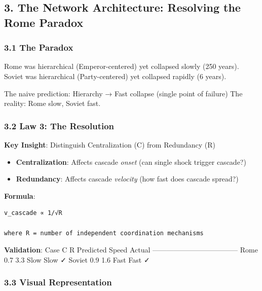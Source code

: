 \documentclass[11pt,letterpaper]{article}
\providecommand{\tightlist}{%
  \setlength{\itemsep}{0pt}\setlength{\parskip}{0pt}}
\begin{document}
\subsection{3. The Network Architecture: Resolving the Rome
Paradox}\label{the-network-architecture-resolving-the-rome-paradox}

\subsubsection{3.1 The Paradox}\label{the-paradox}

Rome was hierarchical (Emperor-centered) yet collapsed slowly (250
years). Soviet was hierarchical (Party-centered) yet collapsed rapidly
(6 years).

The naive prediction: Hierarchy → Fast collapse (single point of
failure) The reality: Rome slow, Soviet fast.

\subsubsection{3.2 Law 3: The Resolution}\label{law-3-the-resolution}

\textbf{Key Insight}: Distinguish Centralization (C) from Redundancy (R)

\begin{itemize}
\tightlist
\item
  \textbf{Centralization}: Affects cascade \emph{onset} (can single
  shock trigger cascade?)
\item
  \textbf{Redundancy}: Affects cascade \emph{velocity} (how fast does
  cascade spread?)
\end{itemize}

\textbf{Formula}:

\begin{verbatim}
v_cascade ∝ 1/√R

where R = number of independent coordination mechanisms
\end{verbatim}

\textbf{Validation}: \textbar{} Case \textbar{} C \textbar{} R
\textbar{} Predicted Speed \textbar{} Actual \textbar{}
\textbar------\textbar---\textbar---\textbar-----------------\textbar--------\textbar{}
\textbar{} Rome \textbar{} 0.7 \textbar{} 3.3 \textbar{} Slow \textbar{}
Slow ✓ \textbar{} \textbar{} Soviet \textbar{} 0.9 \textbar{} 1.6
\textbar{} Fast \textbar{} Fast ✓ \textbar{}

\subsubsection{3.3 Visual Representation}\label{visual-representation}
\end{document}
